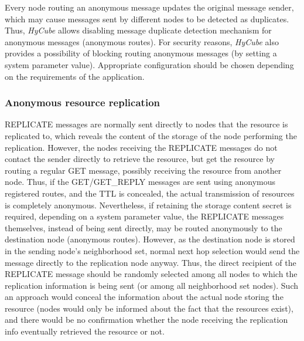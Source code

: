Every node routing an anonymous message updates the original message sender, which may cause messages sent by different nodes to be detected as duplicates. Thus, \emph{HyCube} allows disabling message duplicate detection mechanism for anonymous messages (anonymous routes). For security reasons, \emph{HyCube} also provides a possibility of blocking routing anonymous messages (by setting a system parameter value). Appropriate configuration should be chosen depending on the requirements of the application.




\subsubsection{Anonymous resource replication}

REPLICATE messages are normally sent directly to nodes that the resource is replicated to, which reveals the content of the storage of the node performing the replication. However, the nodes receiving the REPLICATE messages do not contact the sender directly to retrieve the resource, but get the resource by routing a regular GET message, possibly receiving the resource from another node. Thus, if the GET/GET\_REPLY messages are sent using anonymous registered routes, and the TTL is concealed, the actual transmission of resources is completely anonymous. Nevertheless, if retaining the storage content secret is required, depending on a system parameter value, the REPLICATE messages themselves, instead of being sent directly, may be routed anonymously to the destination node (anonymous routes). However, as the destination node is stored in the sending node's neighborhood set, normal next hop selection would send the message directly to the replication node anyway. Thus, the direct recipient of the REPLICATE message should be randomly selected among all nodes to which the replication information is being sent (or among all neighborhood set nodes). Such an approach would conceal the information about the actual node storing the resource (nodes would only be informed about the fact that the resources exist), and there would be no confirmation whether the node receiving the replication info eventually retrieved the resource or not.













